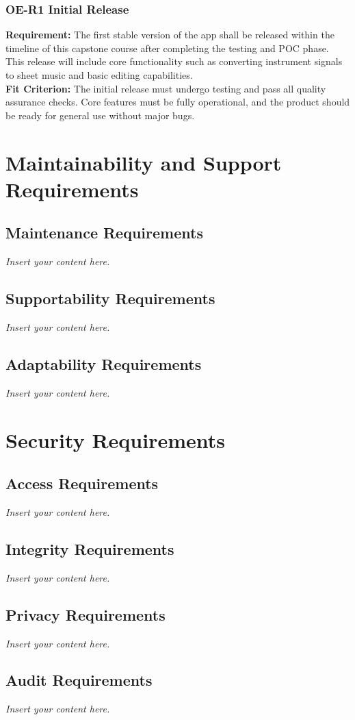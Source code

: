 \documentclass[12pt]{article}
\newcommand{\lips}{\textit{Insert your content here.}}
\begin{document}
\subsubsection*{OE-R1 Initial Release}
\textbf{Requirement:} The first stable version of the app shall be released within the timeline of this capstone course after completing the testing and POC phase. This release will include core functionality such as converting instrument signals to sheet music and basic editing capabilities.\\
\textbf{Fit Criterion:} The initial release must undergo testing and pass all quality assurance checks. Core features must be fully operational, and the product should be ready for general use without major bugs.

\section{Maintainability and Support Requirements}
\subsection{Maintenance Requirements}
\lips
\subsection{Supportability Requirements}
\lips
\subsection{Adaptability Requirements}
\lips

\section{Security Requirements}
\subsection{Access Requirements}
\lips
\subsection{Integrity Requirements}
\lips
\subsection{Privacy Requirements}
\lips
\subsection{Audit Requirements}
\lips
\end{document}
